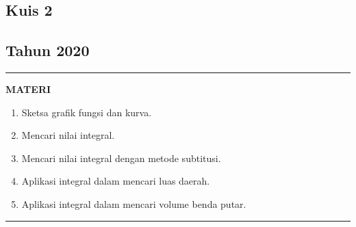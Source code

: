 \begin{flushright}
    \section*{\Large{Kuis 2}}
    \subsection*{Tahun 2020}
\end{flushright}


\vspace{0.5cm}\hrule height 2pt\vspace{0.5cm}


\begin{center}
\textbf{\large{MATERI}}
\begin{enumerate}[leftmargin=*, label={\arabic*}.]
    \item Sketsa grafik fungsi dan kurva.
    \item Mencari nilai integral.
    \item Mencari nilai integral dengan metode subtitusi.
    \item Aplikasi integral dalam mencari luas daerah.
    \item Aplikasi integral dalam mencari volume benda putar.
\end{enumerate}
\end{center}


\vspace{0.2cm}\hrule height 1pt\vspace{0.5cm}


